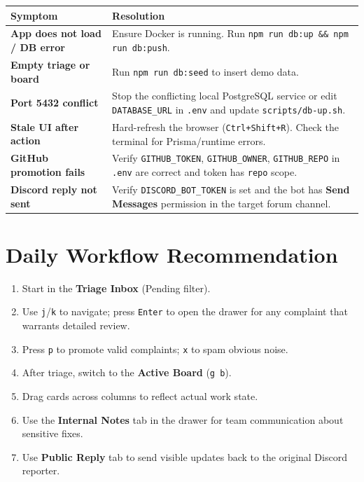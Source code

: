 \documentclass[12pt,a4paper]{report}
\begin{document}
\begin{longtable}{>{\bfseries}p{5cm} p{8cm}}
\toprule
Symptom & Resolution \\
\midrule
\endhead
App does not load / DB error & Ensure Docker is running. Run
  \texttt{npm run db:up \&\& npm run db:push}. \\
Empty triage or board & Run \texttt{npm run db:seed} to insert demo data. \\
Port 5432 conflict & Stop the conflicting local PostgreSQL service or edit
  \texttt{DATABASE\_URL} in \texttt{.env} and update \texttt{scripts/db-up.sh}. \\
Stale UI after action & Hard-refresh the browser (\texttt{Ctrl+Shift+R}).
  Check the terminal for Prisma/runtime errors. \\
GitHub promotion fails & Verify \texttt{GITHUB\_TOKEN}, \texttt{GITHUB\_OWNER},
  \texttt{GITHUB\_REPO} in \texttt{.env} are correct and token has \texttt{repo}
  scope. \\
Discord reply not sent & Verify \texttt{DISCORD\_BOT\_TOKEN} is set and the
  bot has \textbf{Send Messages} permission in the target forum channel. \\
\bottomrule
\end{longtable}

\section{Daily Workflow Recommendation}

\begin{enumerate}
  \item Start in the \textbf{Triage Inbox} (Pending filter).
  \item Use \texttt{j}/\texttt{k} to navigate; press \texttt{Enter} to open
    the drawer for any complaint that warrants detailed review.
  \item Press \texttt{p} to promote valid complaints; \texttt{x} to spam
    obvious noise.
  \item After triage, switch to the \textbf{Active Board} (\texttt{g b}).
  \item Drag cards across columns to reflect actual work state.
  \item Use the \textbf{Internal Notes} tab in the drawer for team
    communication about sensitive fixes.
  \item Use \textbf{Public Reply} tab to send visible updates back to the
    original Discord reporter.
\end{enumerate}
\end{document}
